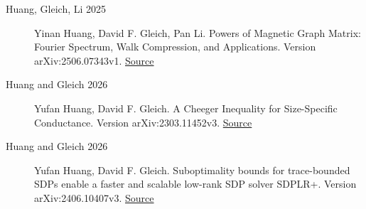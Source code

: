 \begin{description}
\item[Huang, Gleich, Li 2025] Yinan Huang, David F. Gleich, Pan Li. Powers of Magnetic Graph Matrix: Fourier Spectrum, Walk Compression, and Applications. Version arXiv:2506.07343v1. \href{https://arxiv.org/html/2506.07343v1}{Source}
\item[Huang and Gleich 2026] Yufan Huang, David F. Gleich. A Cheeger Inequality for Size-Specific Conductance. Version arXiv:2303.11452v3. \href{https://arxiv.org/html/2303.11452v3}{Source}
\item[Huang and Gleich 2026] Yufan Huang, David F. Gleich. Suboptimality bounds for trace-bounded SDPs enable a faster and scalable low-rank SDP solver SDPLR+. Version arXiv:2406.10407v3. \href{https://arxiv.org/html/2406.10407v3}{Source}
\end{description}
